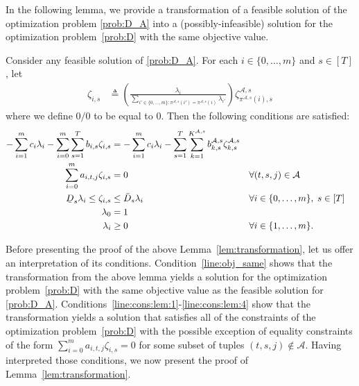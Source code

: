 \documentclass[nonblindrev,mnsc]{informs3} %
\newcommand{\ubar}[1]{\text{\b{$#1$}}}
\begin{document}
\begin{APPENDICES}
In the following lemma, we provide a transformation of a feasible solution of the optimization problem \eqref{prob:D_A} into a (possibly-infeasible) solution  for the optimization problem~\eqref{prob:D} with the same objective value. 
\begin{lemma} \label{lem:transformation}
Consider any feasible solution of \eqref{prob:D_A}. For each $i \in \{0,\ldots,m\}$ and $s \in [T]$, let
\begin{align*}
\zeta_{i,s} &\triangleq 
\left( \frac{\lambda_i}{\sum_{i' \in \{0,\ldots,m\}: \pi^{\mathcal{A},s}(i') = \pi^{\mathcal{A},s}(i)} \lambda_{i'}} \right) \zeta^{\mathcal{A},s}_{\pi^{\mathcal{A},s}(i),s}
\end{align*}
where we define $0/0$ to be equal to $0$. 
Then the following conditions are satisfied:
\begin{subequations}
\begin{align}
 - \sum_{i=1}^m c_i \lambda_i - \sum_{i=0}^m \sum_{s=1}^T  b_{i,s} \zeta_{i,s}  & = - \sum_{i=1}^m c_i \lambda_i -  \sum_{s=1}^T  \sum_{k=1}^{K^{\mathcal{A},s}} b^{\mathcal{A},s}_{k,s} \zeta^{\mathcal{A},s}_{k,s} \label{line:obj_same} \\
\sum_{i=0}^m   a_{i,t,j}  \zeta_{i,s}&= 0 && \forall (t,s,j) \in \mathcal{A} \label{line:cons:lem:1}\\
  \ubar{D}_s \lambda_i  \le \zeta_{i,s} &\le \bar{D}_s \lambda_i && \forall i \in \{0,\ldots,m\}, \; s \in [T] \label{line:cons:lem:2}\\
 \lambda_0& = 1\label{line:cons:lem:3} \\
\lambda_i & \ge 0 && \forall i \in \{1,\ldots,m\}.\label{line:cons:lem:4}  
\end{align}
\end{subequations}
\end{lemma}
Before presenting the proof of the above  Lemma~\ref{lem:transformation}, let us offer an interpretation of its conditions. 
Condition~\eqref{line:obj_same} shows that the transformation from the above lemma yields a solution for the optimization problem~\eqref{prob:D} with the same objective value as the feasible solution for \eqref{prob:D_A}. Conditions~\eqref{line:cons:lem:1}-\eqref{line:cons:lem:4} show that the transformation yields a solution that satisfies all of the constraints of the optimization problem~\eqref{prob:D} with the possible exception of equality constraints of the form $\sum_{i=0}^m   a_{i,t,j}  \zeta_{i,s} = 0$ for some subset of tuples $ (t,s,j) \notin \mathcal{A}$. Having interpreted those conditions, we now present the proof of Lemma~\ref{lem:transformation}. 




\end{APPENDICES}
\end{document}
